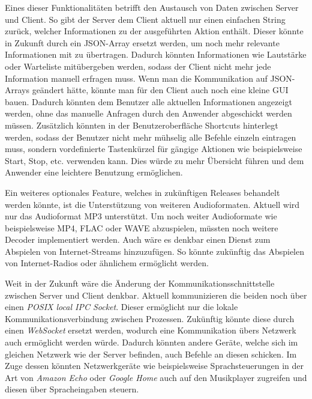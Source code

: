 Eines dieser Funktionalitäten betrifft den Austausch von Daten zwischen 
Server und Client. So gibt der Server dem Client aktuell nur einen einfachen
String zurück, welcher Informationen zu der ausgeführten Aktion enthält. Dieser
könnte in Zukunft durch ein \ac{JSON}-Array ersetzt werden, um noch mehr
relevante Informationen mit zu übertragen. Dadurch könnten Informationen wie
Lautstärke oder Warteliste mitübergeben werden, sodass der Client nicht mehr
jede Information manuell erfragen muss. \newline
Wenn man die Kommunikation auf \ac{JSON}-Arrays geändert hätte, könnte man für
den Client auch noch eine kleine \ac{GUI} bauen. Dadurch könnten dem Benutzer alle
aktuellen Informationen angezeigt werden, ohne das manuelle Anfragen durch den
Anwender abgeschickt werden müssen. Zusätzlich könnten in der Benutzeroberfläche
Shortcuts hinterlegt werden, sodass der Benutzer nicht mehr mühselig alle
Befehle einzeln eintragen muss, sondern vordefinierte Tastenkürzel für gängige
Aktionen wie beispielsweise Start, Stop, etc. verwenden kann. Dies würde zu mehr Übersicht
führen und dem Anwender eine leichtere Benutzung ermöglichen. \hfill \break

Ein weiteres optionales Feature, welches in zukünftigen Releases behandelt werden könnte,
ist die Unterstützung von weiteren Audioformaten. Aktuell wird nur das
Audioformat \ac{MP3} unterstützt. Um noch weiter Audioformate wie
beispielsweise \ac{MP4}, \ac{FLAC} oder \ac{WAVE} abzuspielen,
müssten noch weitere Decoder implementiert werden. \newline
Auch wäre es denkbar einen Dienst zum Abspielen von Internet-Streams
hinzuzufügen. So könnte zukünftig das Abspielen von Internet-Radios oder
ähnlichem ermöglicht werden. \hfill \break

Weit in der Zukunft wäre die Änderung der Kommunikationsschnittstelle zwischen
Server und Client denkbar. Aktuell kommunizieren die beiden noch über einen
\textit{\ac{POSIX} local \ac{IPC} Socket}. Dieser ermöglicht nur die lokale
Kommunikationsverbindung zwischen Prozessen. Zukünftig könnte diese durch einen
\textit{WebSocket} ersetzt werden, wodurch eine Kommunikation übers Netzwerk
auch ermöglicht werden würde. Dadurch könnten andere Geräte, welche sich im
gleichen Netzwerk wie der Server befinden, auch Befehle an diesen schicken. 
Im Zuge dessen könnten Netzwerkgeräte wie beispielsweise Sprachsteuerungen in
der Art von \textit{Amazon Echo} oder \textit{Google Home} auch auf den
Musikplayer zugreifen und diesen über Spracheingaben steuern.

